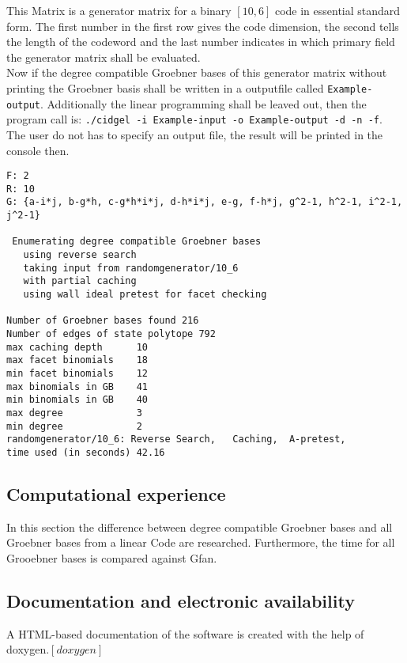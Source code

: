 This Matrix is a generator matrix for a binary $[10,6]$ code in essential standard form. 
The first number in the first row gives the code dimension, the second tells the length of the codeword and the last number indicates in which primary field the generator matrix shall be evaluated.\\

Now if the degree compatible Groebner bases of this generator  matrix without printing the Groebner basis shall be written in a outputfile called \texttt{Example-output}. Additionally the linear programming shall be leaved out, then the program call is: \texttt{./cidgel -i Example-input -o Example-output -d -n -f}.
The user do not has to specify an output file, the result will be printed in the console then.

\newpage

\begin{lstlisting}[basicstyle=\fontfamily{courier}\selectfont]
% starting GB:
F: 2
R: 10
G: {a-i*j, b-g*h, c-g*h*i*j, d-h*i*j, e-g, f-h*j, g^2-1, h^2-1, i^2-1, j^2-1}

 Enumerating degree compatible Groebner bases
   using reverse search
   taking input from randomgenerator/10_6
   with partial caching
   using wall ideal pretest for facet checking

Number of Groebner bases found 216
Number of edges of state polytope 792
max caching depth      10
max facet binomials    18
min facet binomials    12
max binomials in GB    41
min binomials in GB    40
max degree             3
min degree             2
randomgenerator/10_6: Reverse Search,   Caching,  A-pretest,
time used (in seconds) 42.16
\end{lstlisting}
  






\subsection{Computational experience}
\label{subsec:compexp} 
In this section the difference between degree compatible Groebner bases and all Groebner bases from a linear Code are researched. Furthermore, the time for all Grooebner bases is compared against Gfan.




\subsection{Documentation and electronic availability}
\label{subsec:docu}
A HTML-based documentation of the software is created with the help of doxygen.$[doxygen]$

\newpage

